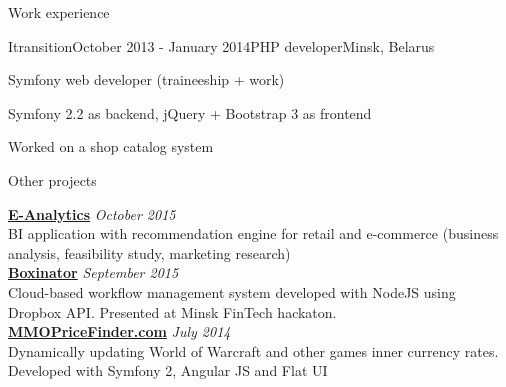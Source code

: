 \documentclass{resume} %
\begin{document}
\begin{rSection}{Work experience}

\begin{rSubsection}{Itransition}{October 2013 - January 2014}{PHP developer}{Minsk, Belarus}
\item Symfony web developer (traineeship + work)
\item Symfony 2.2 as backend, jQuery + Bootstrap 3 as frontend
\item Worked on a shop catalog system
\end{rSubsection}

\end{rSection}


\begin{rSection}{Other projects}

{\bf \href{http://pirateminds.com/e-analytics}{E-Analytics}} \hfill {\em October 2015} \\ 
BI application with recommendation engine for retail and e-commerce (business analysis, feasibility study, marketing research) \\

{\bf \href{http://boxinator.xyz}{Boxinator}} \hfill {\em September 2015} \\ 
Cloud-based workflow management system developed with NodeJS using Dropbox API. Presented at Minsk FinTech hackaton. \\

{\bf \href{http://mmopricefinder.com}{MMOPriceFinder.com}} \hfill {\em July 2014} \\ 
Dynamically updating World of Warcraft and other games inner currency rates. Developed with Symfony 2, Angular JS and Flat UI \\

\end{rSection}



\end{document}
